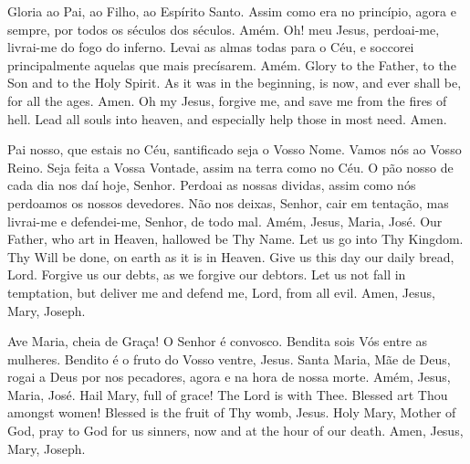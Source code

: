   \beginverse
    \parspace
    Gloria ao Pai, ao Filho, ao Espírito Santo.
    Assim como era no princípio, agora e sempre,
    por todos os séculos dos séculos.
    \parspace
    Amém.
    \parspace\parspace
    Oh! meu Jesus, perdoai-me, livrai-me do fogo do
    inferno. Levai as almas todas para o Céu, e soccorei
    principalmente aquelas que mais precísarem.
    \parspace
    Amém.
  \endverse
  \beginverse
    \parspace
    Glory to the Father, to the Son and to the Holy Spirit.
    As it was in the beginning, is now, and ever shall be,
    for all the ages.
    \parspace
    Amen.
    \parspace\parspace
    Oh my Jesus, forgive me, and save me from the fires
    of hell. Lead all souls into heaven, and especially
    help those in most need.
    \parspace
    Amen.
  \endverse
\endsong


  \beginverse
    Pai nosso,
    que estais no Céu,
    santificado seja o Vosso Nome.
    Vamos nós ao Vosso Reino.
    Seja feita a Vossa Vontade,
    assim na terra como no Céu.
    O pão nosso de cada dia nos daí hoje, Senhor.
    Perdoai as nossas dividas,
    assim como nós perdoamos os nossos devedores.
    Não nos deixas, Senhor, cair em tentação,
    mas livrai-me e defendei-me, Senhor,
    de todo mal.
    \parspace
    Amém, Jesus, Maria, José.
  \endverse
  \beginverse
    Our Father,
    who art in Heaven,
    hallowed be Thy Name.
    Let us go into Thy Kingdom.
    Thy Will be done,
    on earth as it is in Heaven.
    Give us this day our daily bread, Lord.
    Forgive us our debts,
    as we forgive our debtors.
    Let us not fall in temptation,
    but deliver me and defend me, Lord,
    from all evil.
    \parspace
    Amen, Jesus, Mary, Joseph.
  \endverse
\endsong


  \beginverse
    Ave Maria,
    cheia de Graça!
    O Senhor é convosco.
    Bendita sois Vós entre as mulheres.
    Bendito é o fruto do Vosso ventre, Jesus.
    Santa Maria, Mãe de Deus,
    rogai a Deus por nos pecadores,
    agora e na hora de nossa morte.
    \parspace
    Amém, Jesus, Maria, José.
  \endverse
  \beginverse
    Hail Mary,
    full of grace!
    The Lord is with Thee.
    Blessed art Thou amongst women!
    Blessed is the fruit of Thy womb, Jesus.
    Holy Mary, Mother of God,
    pray to God for us sinners,
    now and at the hour of our death.
    \parspace
    Amen, Jesus, Mary, Joseph.
  \endverse
\endsong



